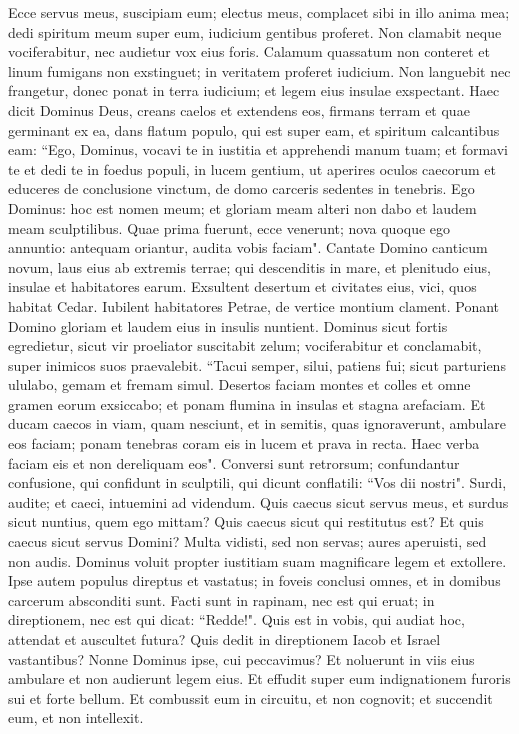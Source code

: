 \begin{biblechapter}  
\verse Ecce servus meus, suscipiam eum; electus meus, complacet sibi in illo anima mea; dedi spiritum meum super eum, iudicium gentibus proferet. 
\verse Non clamabit neque vociferabitur, nec audietur vox eius foris. 
\verse Calamum quassatum non conteret et linum fumigans non exstinguet; in veritatem proferet iudicium. 
\verse Non languebit nec frangetur, donec ponat in terra iudicium; et legem eius insulae exspectant. 
\verse Haec dicit Dominus Deus, creans caelos et extendens eos, firmans terram et quae germinant ex ea, dans flatum populo, qui est super eam, et spiritum calcantibus eam: 
\verse “Ego, Dominus, vocavi te in iustitia et apprehendi manum tuam; et formavi te et dedi te in foedus populi, in lucem gentium, 
\verse ut aperires oculos caecorum et educeres de conclusione vinctum, de domo carceris sedentes in tenebris. 
\verse Ego Dominus: hoc est nomen meum; et gloriam meam alteri non dabo et laudem meam sculptilibus. 
\verse Quae prima fuerunt, ecce venerunt; nova quoque ego annuntio: antequam oriantur, audita vobis faciam". 
\verse Cantate Domino canticum novum, laus eius ab extremis terrae; qui descenditis in mare, et plenitudo eius, insulae et habitatores earum. 
\verse Exsultent desertum et civitates eius, vici, quos habitat Cedar. Iubilent habitatores Petrae, de vertice montium clament. 
\verse Ponant Domino gloriam et laudem eius in insulis nuntient. 
\verse Dominus sicut fortis egredietur, sicut vir proeliator suscitabit zelum; vociferabitur et conclamabit, super inimicos suos praevalebit. 
\verse “Tacui semper, silui, patiens fui; sicut parturiens ululabo, gemam et fremam simul. 
\verse Desertos faciam montes et colles et omne gramen eorum exsiccabo; et ponam flumina in insulas et stagna arefaciam. 
\verse Et ducam caecos in viam, quam nesciunt, et in semitis, quas ignoraverunt, ambulare eos faciam; ponam tenebras coram eis in lucem et prava in recta. Haec verba faciam eis et non dereliquam eos". 
\verse Conversi sunt retrorsum; confundantur confusione, qui confidunt in sculptili, qui dicunt conflatili: “Vos dii nostri". 
\verse Surdi, audite; et caeci, intuemini ad videndum. 
\verse Quis caecus sicut servus meus, et surdus sicut nuntius, quem ego mittam? Quis caecus sicut qui restitutus est? Et quis caecus sicut servus Domini? 
\verse Multa vidisti, sed non servas; aures aperuisti, sed non audis. 
\verse Dominus voluit propter iustitiam suam magnificare legem et extollere. 
\verse Ipse autem populus direptus et vastatus; in foveis conclusi omnes, et in domibus carcerum absconditi sunt. Facti sunt in rapinam, nec est qui eruat; in direptionem, nec est qui dicat: “Redde!". 
\verse Quis est in vobis, qui audiat hoc, attendat et auscultet futura? 
\verse Quis dedit in direptionem Iacob et Israel vastantibus? Nonne Dominus ipse, cui peccavimus? Et noluerunt in viis eius ambulare et non audierunt legem eius. 
\verse Et effudit super eum indignationem furoris sui et forte bellum. Et combussit eum in circuitu, et non cognovit; et succendit eum, et non intellexit. 
\end{biblechapter}

